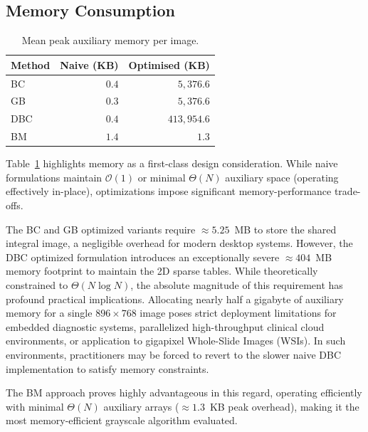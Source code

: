 \subsection{Memory Consumption}
\label{subsec:res_mem}

\begin{table}[h]
\centering
\caption{Mean peak auxiliary memory per image.}
\label{tab:res_mem}
\begin{tabular}{lrr}
\hline
\textbf{Method} & \textbf{Naive (KB)} & \textbf{Optimised (KB)} \\
\hline
BC  & $0.4$       & $5{,}376.6$ \\
GB  & $0.3$       & $5{,}376.6$ \\
DBC & $0.4$       & $413{,}954.6$ \\
BM  & $1.4$       & $1.3$ \\
\hline
\end{tabular}
\end{table}

Table~\ref{tab:res_mem} highlights memory as a first-class design consideration. While naive formulations maintain $\mathcal{O}(1)$ or minimal $\Theta(N)$ auxiliary space (operating effectively in-place), optimizations impose significant memory-performance trade-offs.

The BC and GB optimized variants require $\approx 5.25$~MB to store the shared integral image, a negligible overhead for modern desktop systems. However, the DBC optimized formulation introduces an exceptionally severe $\approx 404$~MB memory footprint to maintain the 2D sparse tables. While theoretically constrained to $\Theta(N \log N)$, the absolute magnitude of this requirement has profound practical implications. Allocating nearly half a gigabyte of auxiliary memory for a single $896 \times 768$ image poses strict deployment limitations for embedded diagnostic systems, parallelized high-throughput clinical cloud environments, or application to gigapixel Whole-Slide Images (WSIs). In such environments, practitioners may be forced to revert to the slower naive DBC implementation to satisfy memory constraints.

The BM approach proves highly advantageous in this regard, operating efficiently with minimal $\Theta(N)$ auxiliary arrays ($\approx 1.3$~KB peak overhead), making it the most memory-efficient grayscale algorithm evaluated.

